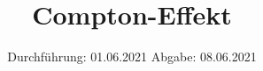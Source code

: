 

\subject{V603}
\title{Compton-Effekt}
\date{%
  Durchführung: 01.06.2021
  \hspace{3em}
  Abgabe: 08.06.2021
}



\maketitle
\thispagestyle{empty}
\tableofcontents
\newpage





\nocite{*}
\printbibliography{}


